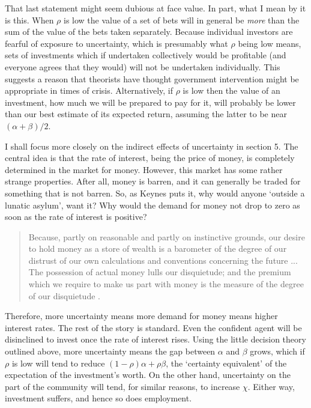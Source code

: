 That last statement might seem dubious at face value. In part, what I mean by it is this. When \(\rho\) is low the value of a set of bets will in general be \textit{more} than the sum of the value of the bets taken separately. Because individual investors are fearful of exposure to uncertainty, which is presumably what \(\rho\) being low means, sets of investments which if undertaken collectively would be profitable (and everyone agrees that they would) will not be undertaken individually. This suggests a reason that theorists have thought government intervention might be appropriate in times of crisis. Alternatively, if \(\rho\) is low then the value of an investment, how much we will be prepared to pay for it, will probably be lower than our best estimate of its expected return, assuming the latter to be near \((\alpha + \beta) /2\).

I shall focus more closely on the indirect effects of uncertainty in section 5. The central idea is that the rate of interest, being the price of money, is completely determined in the market for money. However, this market has some rather strange properties. After all, money is barren, and it can generally be traded for something that is not barren. So, as Keynes puts it, why would anyone `outside a lunatic asylum', want it? Why would the demand for money not drop to zero as soon as the rate of interest is positive?

\begin{quote}
Because, partly on reasonable and partly on instinctive grounds, our desire to hold money as a store of wealth is a barometer of the degree of our distrust of our own calculations and conventions concerning the future ... The possession of actual money lulls our disquietude; and the premium which we require to make us part with money is the measure of the degree of our disquietude \cite[116]{Keynes1937}.
\end{quote}

\noindent Therefore, more uncertainty means more demand for money means higher interest rates. The rest of the story is standard. Even the confident agent will be disinclined to invest once the rate of interest rises. Using the little decision theory outlined above, more uncertainty means the gap between \(\alpha\) and \(\beta\) grows, which if \(\rho\) is low will tend to reduce \((1-\rho)\alpha + \rho \beta\), the `certainty equivalent' of the expectation of the investment's worth. On the other hand, uncertainty on the part of the community will tend, for similar reasons, to increase \(\chi\). Either way, investment suffers, and hence so does employment.

